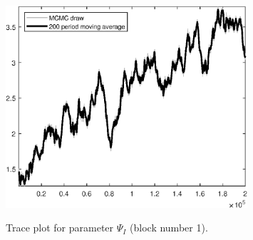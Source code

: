 \begin{figure}[H]
\centering
  \includegraphics[width=0.8\textwidth]{BRS_sectoral_rest/graphs/TracePlot_Psi_I_blck_1}\\
    \caption{Trace plot for parameter ${\Psi_I}$ (block number 1).}
\end{figure}
